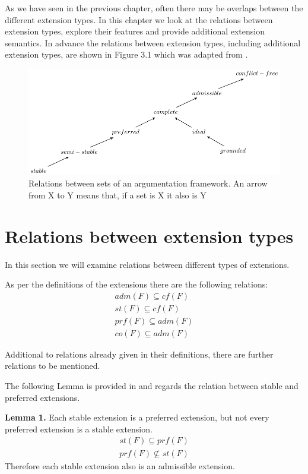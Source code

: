 \documentclass[draft,final]{vutinfth} %
\newcommand{\hl}{\par\vspace{6pt}} %
\newcommand{\cl}{\par\vspace{12pt}} %
\begin{document}
As we have seen in the previous chapter, often there may be overlaps between the different extension types. In this chapter we look at the relations between extension types, explore their features and provide additional extension semantics. In advance the relations between extension types, including additional extension types, are shown in Figure 3.1 which was adapted from \cite{Gorogiannis}.\cl %

\FloatBarrier
	\begin{figure}[!h]
		\centering
		\includegraphics[scale=1]{graphs/diagram_2.pdf}
		\caption[Relations between sets of an argumentation framework]{Relations between sets of an argumentation framework. An arrow from X to Y means that, if a set is X it also is Y}
	\end{figure}
\FloatBarrier

\section{Relations between extension types}
In this section we will examine relations between different types of extensions.\hl

As per the definitions of the extensions there are the following relations:
\begin{align}
	adm(F)\subseteq cf(F)  \\ \label{eq1}
	st(F)\subseteq cf(F) \\
	prf(F)\subseteq adm(F)\\
	co(F)\subseteq adm(F)
\end{align}\cl

Additional to relations already given in their definitions, there are further relations to be mentioned.\hl
The following Lemma is provided in \cite{Dung} and regards the relation between stable and preferred extensions.\cl

\textbf{Lemma 1.}
Each stable extension is a preferred extension, but not every preferred extension is a stable extension.
\begin{align}
	st(F)\subseteq prf(F)\\
	prf(F)\not\subseteq st(F)
\end{align}
Therefore each stable extension also is an admissible extension.\cl
\end{document}
